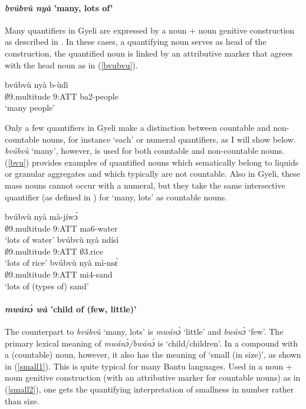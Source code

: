 \paragraph{{\itshape bvúbvù nyà} 'many, lots of'} 
Many quantifiers in Gyeli are expressed by a noun + noun genitive construction as described in . In these cases, a quantifying noun serves as head of the construction, the quantified noun is linked by an attributive marker that agrees with the head noun as in (\ref{bvubvu}). 

\begin{exe}
\ex\label{bvubvu}
  \gll     bvúbvù nyà b-ùdì \\
                $\emptyset$9.multitude 9:ATT ba2-people \\
    \trans `many people'
\end {exe}

\noindent Only a few quantifiers in Gyeli make a distinction between countable and non-countable nouns, for instance `each'  or numeral quantifiers, as I will show below. {\itshape bvúbvù} `many', however, is used for both countable and non-countable nouns. (\ref{bvu}) provides examples of quantified nouns which sematically belong to liquids or granular aggregates and which typically are not countable. Also in Gyeli, these mass nouns cannot occur with a numeral, but they take the same intersective quantifier (as defined in ) for `many, lots' as countable nouns.

\begin{exe}
\ex\label{bvu}
\begin{xlist}
\ex \label{bvu1}
  \gll     bvúbvù nyà mà-jíwɔ́ \\
                $\emptyset$9.multitude 9:ATT ma6-water \\
    \trans `lots of water'
\ex\label{bvu2}
 \gll     bvúbvù nyà ndísì  \\
             $\emptyset$9.multitude 9:ATT $\emptyset$3.rice  \\
    \trans `lots of rice'
\ex\label{bvu3}
 \gll   bvúbvù nyà mì-nsɛ́   \\
             $\emptyset$9.multitude 9:ATT mi4-sand    \\
    \trans `lots of (types of) sand'
\end {xlist}
\end {exe}

\paragraph{{\itshape mwánɔ̀ wà} 'child of (few, little)'} 
The counterpart to {\itshape bvúbvù} `many, lots' is {\itshape mwánɔ̀} `little' and {\itshape bwánɔ̀} `few'. The primary lexical meaning of {\itshape mwánɔ̀/bwánɔ̀} is `child/children'. In a compound with a (countable) noun, however, it also has the meaning of `small (in size)', as shown in (\ref{small1}). This is quite typical for many Bantu languages. Used in a noun + noun genitive construction (with an attributive marker for countable nouns) as in (\ref{small2}), one gets the quantifying interpretation of smallness in number rather than size.

